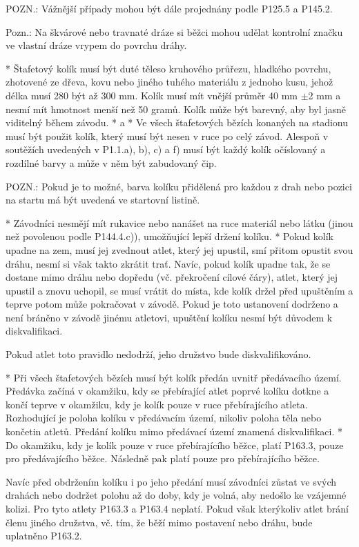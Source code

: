 POZN.: Vážnější případy mohou být dále projednány podle P125.5 a P145.2.

Pozn.: Na škvárové nebo travnaté dráze si běžci mohou udělat kontrolní značku ve vlastní dráze vrypem do povrchu dráhy.

* Štafetový kolík musí být duté těleso kruhového průřezu, hladkého povrchu, zhotovené ze dřeva, kovu nebo jiného tuhého materiálu z jednoho kusu, jehož délka musí 280 být až 300 mm. Kolík musí mít vnější průměr 40 mm $\pm$2 mm a nesmí mít hmotnost menší než 50 gramů. Kolík může být barevný, aby byl jasně viditelný během závodu.
* \begitems \style a
  * Ve všech štafetových bězích konaných na stadionu musí být použit kolík, který musí být nesen v ruce po celý závod. Alespoň v soutěžích uvedených v P1.1.a), b), c) a f) musí být každý kolík očíslovaný a rozdílné barvy a může v něm být zabudovaný čip.

  POZN.: Pokud je to možné, barva kolíku přidělená pro každou z drah nebo pozici na startu má být uvedená ve startovní listině.

  * Závodníci nesmějí mít rukavice nebo nanášet na ruce materiál nebo látku (jinou než povolenou podle P144.4.c)), umožňující lepší držení kolíku.
  * Pokud kolík upadne na zem, musí jej zvednout atlet, který jej upustil, smí přitom opustit svou dráhu, nesmí si však takto zkrátit trať. Navíc, pokud kolík upadne tak, že se dostane mimo dráhu nebo dopředu (vč. překročení cílové čáry), atlet, který jej upustil a znovu uchopil, se musí vrátit do místa, kde kolík držel před upuštěním a teprve potom může pokračovat v závodě. Pokud je toto ustanovení dodrženo a není bráněno v závodě jinému atletovi, upuštění kolíku nesmí být důvodem k diskvalifikaci.
  \enditems

Pokud atlet toto pravidlo nedodrží, jeho družstvo bude diskvalifikováno.

* Při všech štafetových bězích musí být kolík předán uvnitř předávacího území. Předávka začíná v okamžiku, kdy se přebírající atlet poprvé kolíku dotkne a končí teprve v okamžiku, kdy je kolík pouze v ruce přebírajícího atleta. Rozhodující je poloha kolíku v předávacím území, nikoliv poloha těla nebo končetin atletů. Předání kolíku mimo předávací území znamená diskvalifikaci.
* Do okamžiku, kdy je kolík pouze v ruce přebírajícího běžce, platí P163.3, pouze pro předávajícího běžce. Následně pak platí pouze pro přebírajícího běžce.

Navíc před obdržením kolíku i po jeho předání musí závodníci zůstat ve svých drahách nebo dodržet polohu až do doby, kdy je volná, aby nedošlo ke vzájemné kolizi. Pro tyto atlety P163.3 a P163.4 neplatí. Pokud však kterýkoliv atlet brání členu jiného družstva, vč. tím, že běží mimo postavení nebo dráhu, bude uplatněno P163.2.

